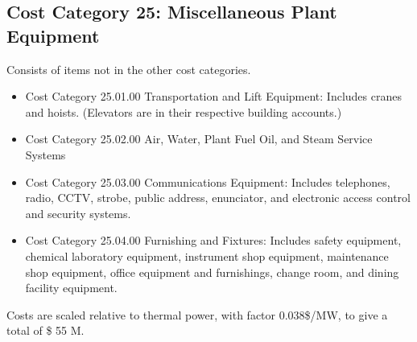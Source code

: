 \subsection{Cost Category 25: Miscellaneous Plant Equipment}  %

Consists of items not in the other cost categories.

\begin{itemize}

\item Cost Category 25.01.00 Transportation and Lift Equipment: Includes cranes and hoists. (Elevators are in their respective building accounts.)

\item  Cost Category 25.02.00 Air, Water, Plant Fuel Oil, and Steam Service Systems

\item  Cost Category 25.03.00 Communications Equipment: Includes telephones, radio, CCTV, strobe, public address, enunciator, and electronic access control and security systems.

\item  Cost Category 25.04.00 Furnishing and Fixtures: Includes safety equipment, chemical laboratory equipment, instrument shop equipment, maintenance shop equipment, office equipment and furnishings, change room, and dining facility equipment.

\end{itemize}

Costs are scaled relative to thermal power, with factor 0.038\$/MW, to give a total of \$ 55 M. 
